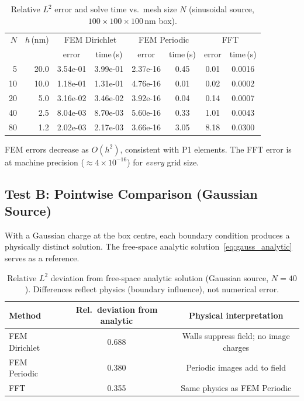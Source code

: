 \documentclass[11pt,a4paper]{article}
\begin{document}
\begin{table}[h]
\centering
\caption{Relative $L^2$ error and solve time vs.\ mesh size $N$
          (sinusoidal source, $100\times100\times100$\,nm box).}
\label{tab:convergence}
\begin{tabular}{rr|cc|cc|cc}
\toprule
$N$ & $h$\,(nm) & \multicolumn{2}{c|}{FEM Dirichlet}
              & \multicolumn{2}{c|}{FEM Periodic}
              & \multicolumn{2}{c}{FFT} \\
    &           & error & time\,(s) & error & time\,(s) & error & time\,(s) \\
\midrule
        5 & 20.0 & 3.54e-01 & 3.99e-01 & 2.37e-16 & 0.45 & 0.01 & 0.0016 \\
        10 & 10.0 & 1.18e-01 & 1.31e-01 & 4.76e-16 & 0.01 & 0.02 & 0.0002 \\
        20 & 5.0 & 3.16e-02 & 3.46e-02 & 3.92e-16 & 0.04 & 0.14 & 0.0007 \\
        40 & 2.5 & 8.04e-03 & 8.70e-03 & 5.60e-16 & 0.33 & 1.01 & 0.0043 \\
        80 & 1.2 & 2.02e-03 & 2.17e-03 & 3.66e-16 & 3.05 & 8.18 & 0.0300 \\
\bottomrule
\end{tabular}
\end{table}

FEM errors decrease as $O(h^2)$, consistent with P1 elements.
The FFT error is at machine precision ($\approx 4\times10^{-16}$)
for \emph{every} grid size.

\subsection{Test B: Pointwise Comparison (Gaussian Source)}

With a Gaussian charge at the box centre, each boundary condition
produces a physically distinct solution.  The free-space analytic
solution~\eqref{eq:gauss_analytic} serves as a reference.

\begin{table}[h]
\centering
\caption{Relative $L^2$ deviation from free-space analytic solution
          (Gaussian source, $N=40$).  Differences reflect physics
          (boundary influence), not numerical error.}
\label{tab:gauss}
\begin{tabular}{lcc}
\toprule
Method & Rel.\ deviation from analytic & Physical interpretation \\
\midrule
FEM Dirichlet & 0.688 & Walls suppress field; no image charges \\
FEM Periodic  & 0.380 & Periodic images add to field \\
FFT           & 0.355 & Same physics as FEM Periodic \\
\bottomrule
\end{tabular}
\end{table}
\end{document}
